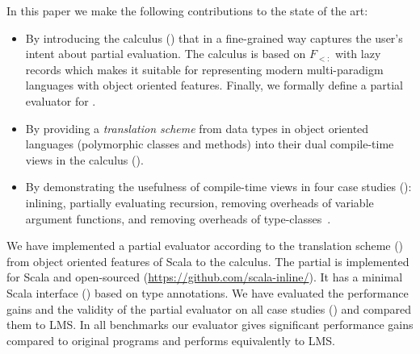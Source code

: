 In this paper we make the following contributions to the state of the art:
\begin{itemize}

 \item By introducing the \calculus calculus () that in a
  fine-grained way captures the user's intent about partial evaluation. The calculus
  is based on $F_{<:}$ with lazy records which makes it suitable for representing
  modern multi-paradigm languages with object oriented features. Finally,
  we formally define a partial evaluator for \calculus.

 \item By providing a \emph{translation scheme} from data types in object oriented languages
  (polymorphic classes and methods) into their dual compile-time views in the
  \calculus calculus ().

 \item By demonstrating the usefulness of compile-time views in four case
 studies (): inlining, partially evaluating recursion,
 removing overheads of variable argument functions, and removing overheads of
 type-classes~\cite{oliveira2010type}.

\end{itemize}

We have implemented a partial evaluator according to the translation scheme ()
 from object oriented features of Scala to the \calculus calculus. The partial is
 implemented for Scala and open-sourced (\url{https://github.com/scala-inline/}).
 It has a minimal Scala interface () based on type annotations.
 We have evaluated the performance gains and the validity of the partial evaluator
 on all case studies () and compared them to LMS. In all benchmarks
 our evaluator gives significant performance gains compared to original programs and
 performs equivalently to LMS.





